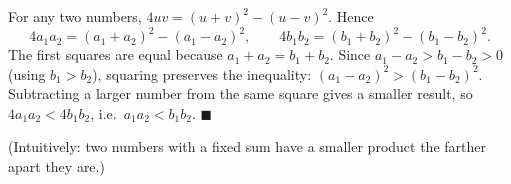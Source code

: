 For any two numbers, $4uv=(u+v)^2-(u-v)^2$. Hence
\[
4a_1a_2=(a_1+a_2)^2-(a_1-a_2)^2,\qquad 4b_1b_2=(b_1+b_2)^2-(b_1-b_2)^2 .
\]
The first squares are equal because $a_1+a_2=b_1+b_2$. Since $a_1-a_2>b_1-b_2>0$ (using $b_1>b_2$), squaring preserves the inequality: $(a_1-a_2)^2>(b_1-b_2)^2$. Subtracting a larger number from the same square gives a smaller result, so $4a_1a_2<4b_1b_2$, i.e.\ $a_1a_2<b_1b_2$. $\blacksquare$

(Intuitively: two numbers with a fixed sum have a smaller product the farther apart they are.)
